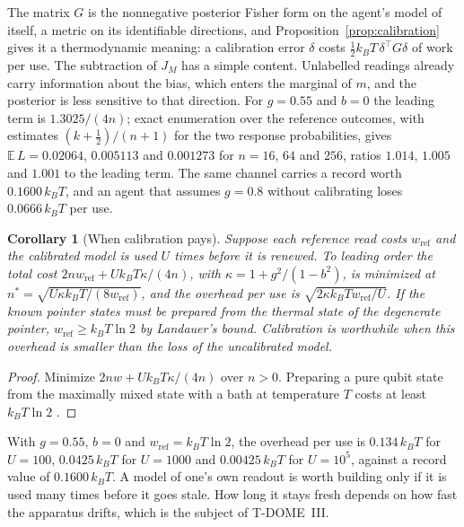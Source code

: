 \documentclass[12pt]{article}
\newtheorem{corollary}[theorem]{Corollary}
\begin{document}
The matrix $G$ is the nonnegative posterior Fisher form on the agent's model of itself, a metric on its identifiable directions, and Proposition~\ref{prop:calibration} gives it a thermodynamic meaning: a calibration error $\delta$ costs $\tfrac12k_BT\,\delta^{\top}G\delta$ of work per use. The subtraction of $J_M$ has a simple content. Unlabelled readings already carry information about the bias, which enters the marginal of $m$, and the posterior is less sensitive to that direction. For $g=0.55$ and $b=0$ the leading term is $1.3025/(4n)$; exact enumeration over the reference outcomes, with estimates $(k+\tfrac12)/(n+1)$ for the two response probabilities, gives $\mathbb E\,L=0.02064$, $0.005113$ and $0.001273$ for $n=16$, $64$ and $256$, ratios $1.014$, $1.005$ and $1.001$ to the leading term. The same channel carries a record worth $0.1600\,k_BT$, and an agent that assumes $g=0.8$ without calibrating loses $0.0666\,k_BT$ per use.

\begin{corollary}[When calibration pays]
\label{cor:amortization}
Suppose each reference read costs $w_{\mathrm{ref}}$ and the calibrated model is used $U$ times before it is renewed. To leading order the total cost $2nw_{\mathrm{ref}}+Uk_BT\kappa/(4n)$, with $\kappa=1+g^2/(1-b^2)$, is minimized at $n^*=\sqrt{U\kappa k_BT/(8w_{\mathrm{ref}})}$, and the overhead per use is $\sqrt{2\kappa k_BTw_{\mathrm{ref}}/U}$. If the known pointer states must be prepared from the thermal state of the degenerate pointer, $w_{\mathrm{ref}}\ge k_BT\ln2$ by Landauer's bound. Calibration is worthwhile when this overhead is smaller than the loss of the uncalibrated model.
\end{corollary}

\begin{proof}
Minimize $2nw+Uk_BT\kappa/(4n)$ over $n>0$. Preparing a pure qubit state from the maximally mixed state with a bath at temperature $T$ costs at least $k_BT\ln2$ \cite{Landauer1961,ReebWolf2014}.
\end{proof}

With $g=0.55$, $b=0$ and $w_{\mathrm{ref}}=k_BT\ln2$, the overhead per use is $0.134\,k_BT$ for $U=100$, $0.0425\,k_BT$ for $U=1000$ and $0.00425\,k_BT$ for $U=10^5$, against a record value of $0.1600\,k_BT$. A model of one's own readout is worth building only if it is used many times before it goes stale. How long it stays fresh depends on how fast the apparatus drifts, which is the subject of T-DOME~III.
\end{document}
